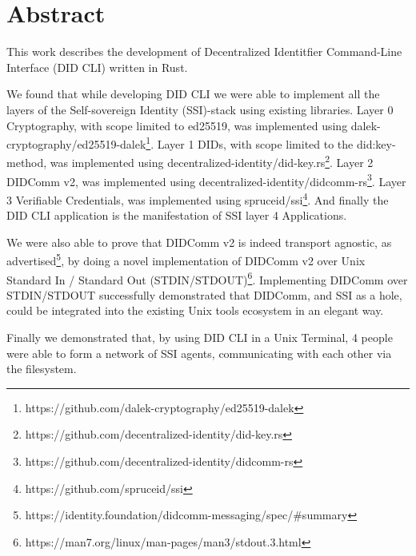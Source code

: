 \chapter*{Abstract}

This work describes the development of Decentralized Identitfier Command-Line Interface (DID CLI) written in Rust.

We found that while developing DID CLI we were able to implement all the layers of the Self-sovereign Identity (SSI)-stack using existing libraries. Layer 0 Cryptography, with scope limited to ed25519, was implemented using dalek-cryptography/ed25519-dalek\footnote{https://github.com/dalek-cryptography/ed25519-dalek}. Layer 1 DIDs, with scope limited to the did:key-method, was implemented using decentralized-identity/did-key.rs\footnote{https://github.com/decentralized-identity/did-key.rs}. Layer 2 DIDComm v2, was implemented using decentralized-identity/didcomm-rs\footnote{https://github.com/decentralized-identity/didcomm-rs}.
Layer 3 Verifiable Credentials, was implemented using spruceid/ssi\footnote{https://github.com/spruceid/ssi}. And finally the DID CLI application is the manifestation of SSI layer 4 Applications.

We were also able to prove that DIDComm v2 is indeed transport agnostic, as advertised\footnote{https://identity.foundation/didcomm-messaging/spec/#summary}, by doing a novel implementation of DIDComm v2 over Unix Standard In / Standard Out (STDIN/STDOUT)\footnote{https://man7.org/linux/man-pages/man3/stdout.3.html}. Implementing DIDComm over STDIN/STDOUT successfully demonstrated that DIDComm, and SSI as a hole, could be integrated into the existing Unix tools ecosystem in an elegant way.

Finally we demonstrated that, by using DID CLI in a Unix Terminal, 4 people were able to form a network of SSI agents, communicating with each other via the filesystem.